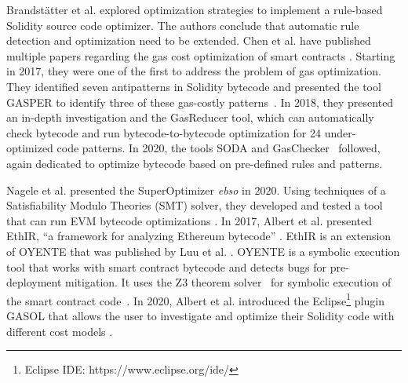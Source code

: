 \documentclass[10pt,conference]{IEEEtran}
\begin{document}
	
	Brandstätter et al. \cite{brandstatter} explored optimization strategies to implement a rule-based Solidity source code optimizer. The authors conclude that automatic rule detection and optimization need to be extended. Chen et al. have published multiple papers regarding the gas cost optimization of smart contracts \cite{chen1devour, chen2gaschecker, chen3soda, chen4stan}. Starting in 2017, they were one of the first to address the problem of gas optimization. They identified seven antipatterns in Solidity bytecode and presented the tool GASPER to identify three of these gas-costly patterns~\cite{chen1devour}. In 2018, they presented an in-depth investigation and the GasReducer tool, which can automatically check bytecode and run bytecode-to-bytecode optimization for 24 under-optimized code patterns. In 2020, the tools SODA \cite{chen3soda} and GasChecker~\cite{chen2gaschecker} followed, again dedicated to optimize bytecode based on pre-defined rules and patterns. 
	
	Nagele et al. presented the SuperOptimizer \textit{ebso} in 2020. Using techniques of a Satisfiability Modulo Theories (SMT) solver, they developed and tested a tool that can run EVM bytecode optimizations \cite{nagele}. In 2017, Albert et al. presented EthIR, ``a framework for analyzing Ethereum bytecode'' \cite{ethir}. EthIR is an extension of OYENTE that was published by Luu et al. \cite{oyente}. OYENTE is a symbolic execution tool that works with smart contract bytecode and detects bugs for pre-deployment mitigation. It uses the Z3 theorem solver~\cite{z3solver} for symbolic execution of the smart contract code~\cite{oyente}. In 2020, Albert et al. introduced the Eclipse\footnote{Eclipse IDE: https://www.eclipse.org/ide/} plugin GASOL that allows the user to investigate and optimize their Solidity code with different cost models \cite{gasol}.
	
\end{document}
